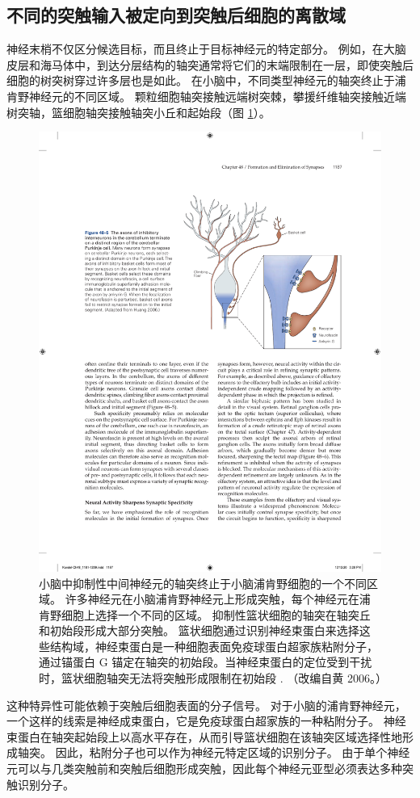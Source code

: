 \subsection{不同的突触输入被定向到突触后细胞的离散域}
神经末梢不仅区分候选目标，而且终止于目标神经元的特定部分。 例如，在大脑皮层和海马体中，到达分层结构的轴突通常将它们的末端限制在一层，即使突触后细胞的树突树穿过许多层也是如此。 在小脑中，不同类型神经元的轴突终止于浦肯野神经元的不同区域。 颗粒细胞轴突接触远端树突棘，攀援纤维轴突接触近端树突轴，篮细胞轴突接触轴突小丘和起始段（图 \ref{fig:48_5}）。

\begin{figure}[htbp]
	\centering
	\includegraphics[width=0.7\linewidth]{chap48/fig_48_5}
	\caption{小脑中抑制性中间神经元的轴突终止于小脑浦肯野细胞的一个不同区域。 许多神经元在小脑浦肯野神经元上形成突触，每个神经元在浦肯野细胞上选择一个不同的区域。 抑制性篮状细胞的轴突在轴突丘和初始段形成大部分突触。 篮状细胞通过识别神经束蛋白来选择这些结构域，神经束蛋白是一种细胞表面免疫球蛋白超家族粘附分子，通过锚蛋白 G 锚定在轴突的初始段。当神经束蛋白的定位受到干扰时，篮状细胞轴突无法将突触形成限制在初始段 . （改编自黄 2006。）}
	\label{fig:48_5}
\end{figure}

这种特异性可能依赖于突触后细胞表面的分子信号。 对于小脑的浦肯野神经元，一个这样的线索是神经成束蛋白，它是免疫球蛋白超家族的一种粘附分子。 神经束蛋白在轴突起始段上以高水平存在，从而引导篮状细胞在该轴突区域选择性地形成轴突。 因此，粘附分子也可以作为神经元特定区域的识别分子。 由于单个神经元可以与几类突触前和突触后细胞形成突触，因此每个神经元亚型必须表达多种突触识别分子。

